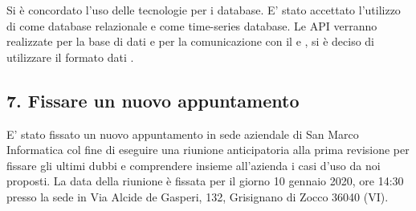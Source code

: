 	Si è concordato l'uso delle tecnologie per i database. E' stato accettato l'utilizzo di  come database relazionale e  come time-series database. Le API verranno realizzate per la base di dati e per la comunicazione con il  e , si è deciso di utilizzare il formato dati .

	\subsection*{7. Fissare un nuovo appuntamento}

	E' stato fissato un nuovo appuntamento in sede aziendale di San Marco Informatica col fine di eseguire una riunione anticipatoria alla prima revisione per fissare gli ultimi dubbi e comprendere insieme all'azienda i casi d'uso da noi proposti. La data della riunione è fissata per il giorno 10 gennaio 2020, ore 14:30 presso la sede in Via Alcide de Gasperi, 132, Grisignano di Zocco 36040 (VI).